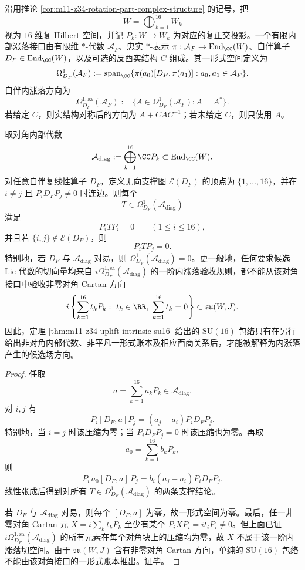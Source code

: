 \begin{definition}\label{def:distill-connes-z34-finite-internal-fluctuation-interface}
沿用推论 \ref{cor:m11-z34-rotation-part-complex-structure} 的记号，把
\[
W=\bigoplus_{k=1}^{16}W_k
\]
视为 \(16\) 维复 Hilbert 空间，并记 \(P_k:W\to W_k\) 为对应的复正交投影。一个有限内部涨落接口由有限维 \(*\)-代数 \(\mathcal A_F\)、忠实 \(*\)-表示 \(\pi:\mathcal A_F\to\mathrm{End}_{\CC}(W)\)、自伴算子 \(D_F\in\mathrm{End}_{\CC}(W)\)，以及可选的反酉实结构 \(C\) 组成。其一形式空间定义为
\[
\Omega^1_{D_F}(\mathcal A_F):=\operatorname{span}_{\CC}\{\pi(a_0)[D_F,\pi(a_1)]:a_0,a_1\in\mathcal A_F\}.
\]
自伴内涨落方向为
\[
\Omega^{1,\mathrm{sa}}_{D_F}(\mathcal A_F):=\{A\in\Omega^1_{D_F}(\mathcal A_F):A=A^*\}.
\]
若给定 \(C\)，则实结构对称后的方向为 \(A+CAC^{-1}\)；若未给定 \(C\)，则只使用 \(A\)。
\end{definition}

\begin{proposition}[对角内部代数的内涨落支撑限制]\label{prop:distill-connes-z34-diagonal-internal-fluctuation-support}
取对角内部代数
\[
\mathcal A_{\mathrm{diag}}:=\bigoplus_{k=1}^{16}\CC P_k\subset\mathrm{End}_{\CC}(W).
\]
对任意自伴复线性算子 \(D_F\)，定义无向支撑图 \(\mathcal E(D_F)\) 的顶点为 \(\{1,\ldots,16\}\)，并在 \(i\ne j\) 且 \(P_iD_FP_j\ne0\) 时连边。则每个
\[
T\in\Omega^1_{D_F}(\mathcal A_{\mathrm{diag}})
\]
满足
\[
P_iTP_i=0\qquad(1\le i\le16),
\]
并且若 \(\{i,j\}\notin\mathcal E(D_F)\)，则
\[
P_iTP_j=0.
\]
特别地，若 \(D_F\) 与 \(\mathcal A_{\mathrm{diag}}\) 对易，则 \(\Omega^1_{D_F}(\mathcal A_{\mathrm{diag}})=0\)。更一般地，任何要求候选 Lie 代数的切向量均来自 \(i\Omega^{1,\mathrm{sa}}_{D_F}(\mathcal A_{\mathrm{diag}})\) 的一阶内涨落验收规则，都不能从该对角接口中验收非零对角 Cartan 方向
\[
i\left\{\sum_{k=1}^{16}t_kP_k:\ t_k\in\RR,\ \sum_{k=1}^{16}t_k=0\right\}\subset\mathfrak{su}(W,J).
\]
因此，定理 \ref{thm:m11-z34-uplift-intrinsic-su16} 给出的 \(\mathrm{SU}(16)\) 包络只有在另行给出非对角内部代数、非平凡一形式账本及相应酉商关系后，才能被解释为内涨落产生的候选场方向。
\end{proposition}
\begin{proof}
任取
\[
a=\sum_{k=1}^{16}a_kP_k\in\mathcal A_{\mathrm{diag}}.
\]
对 \(i,j\) 有
\[
P_i[D_F,a]P_j=(a_j-a_i)P_iD_FP_j.
\]
特别地，当 \(i=j\) 时该压缩为零；当 \(P_iD_FP_j=0\) 时该压缩也为零。再取
\[
a_0=\sum_{k=1}^{16}b_kP_k,
\]
则
\[
P_i\,a_0[D_F,a]\,P_j=b_i(a_j-a_i)P_iD_FP_j.
\]
线性张成后得到对所有 \(T\in\Omega^1_{D_F}(\mathcal A_{\mathrm{diag}})\) 的两条支撑结论。

若 \(D_F\) 与 \(\mathcal A_{\mathrm{diag}}\) 对易，则每个 \([D_F,a]\) 为零，故一形式空间为零。最后，任一非零对角 Cartan 元 \(X=i\sum_kt_kP_k\) 至少有某个 \(P_iXP_i=it_iP_i\ne0\)。但上面已证 \(i\Omega^{1,\mathrm{sa}}_{D_F}(\mathcal A_{\mathrm{diag}})\) 的所有元素在每个对角块上的压缩均为零，故 \(X\) 不属于该一阶内涨落切空间。由于 \(\mathfrak{su}(W,J)\) 含有非零对角 Cartan 方向，单纯的 \(\mathrm{SU}(16)\) 包络不能由该对角接口的一形式账本推出。证毕。
\end{proof}

\endinput
